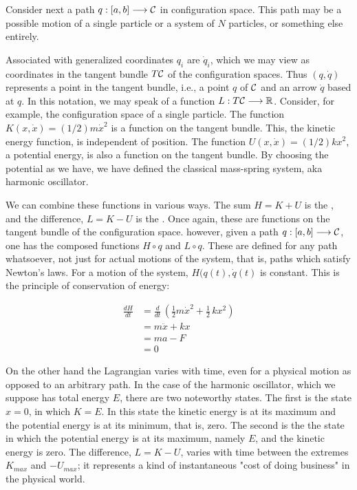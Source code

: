 Consider next a path $q: [a,b] \longrightarrow \mathcal{C}$ in configuration space.  This path may be a possible motion of a single particle or a system of $N$ particles, or something else entirely.

Associated with generalized coordinates $q_i$ are  $\dot q_i$, which we may view as coordinates in the tangent bundle $ T\mathcal{C}$ of the configuration spaces.  Thus $(q,\dot q)$ represents  a point in the tangent bundle, i.e., a point $q$ of $\mathcal{C}$ and an arrow $\dot q$ based at $q$. In this notation, we may speak of a function $L: T\mathcal{C} \longrightarrow \mathbb{R}$.  Consider, for example, the configuration space of a single particle.  The function $K(x, \dot x) = (1/2)m\dot x^2$ is a function on the tangent bundle. This, the kinetic energy function, is independent of position.  The function $U(x, \dot x) = (1/2)kx^2$, a potential energy, is also a function on the tangent bundle.  By choosing the potential as we have, we have defined the classical mass-spring system, aka harmonic oscillator.

We can combine these functions in various ways.  The sum $H = K + U$ is the , and the difference, $L = K - U$ is the .  Once again, these are functions on the tangent bundle of the configuration space.  however, given a path $q: [a, b] \longrightarrow \mathcal{C}$, one has the composed functions $H\circ q$ and $L \circ q$.  These are defined for any path whatsoever, not just for actual motions of the system, that is, paths which satisfy Newton's laws. For a motion of the system, $H(q(t), \dot q(t)$ is constant.  This is the principle of conservation of energy:

\begin{align}
\frac{dH}{dt} &= \frac{d}{dt}\,\left( \frac{1}{2}m\dot x^2 + \frac{1}{2}\,kx^2\right) \\
&= m\ddot x + kx \\
& = ma - F \\
& = 0
\end{align}

On the other hand the Lagrangian varies with time, even for a physical motion as opposed to an arbitrary path.  In the case of the harmonic oscillator, which we suppose has total energy $E$, there are two noteworthy states.  The first is the state $x = 0$, in which $K = E$.  In this state the kinetic energy is at its maximum and the potential energy is at its minimum, that is, zero.  The second is the the state in which the potential energy is at its maximum, namely $E$, and the kinetic energy is zero.  The difference, $L = K - U$, varies with time between the extremes $K_{max}$ and $-U_{max}$; it represents a kind of instantaneous "cost of doing business" in the physical world.  

